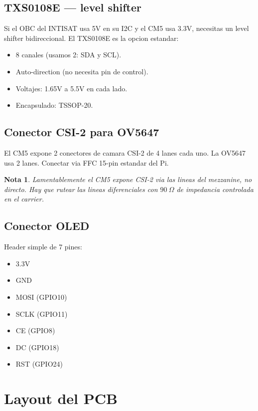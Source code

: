 \documentclass[11pt,a4paper,oneside,openright]{book}
\newtheorem*{nota}{Nota}
\begin{document}
\section{TXS0108E --- level shifter}

Si el OBC del INTISAT usa 5V en su I2C y el CM5 usa 3.3V, necesitas un
level shifter bidireccional. El TXS0108E es la opcion estandar:

\begin{itemize}[leftmargin=2em]
  \item 8 canales (usamos 2: SDA y SCL).
  \item Auto-direction (no necesita pin de control).
  \item Voltajes: 1.65V a 5.5V en cada lado.
  \item Encapsulado: TSSOP-20.
\end{itemize}

\section{Conector CSI-2 para OV5647}

El CM5 expone 2 conectores de camara CSI-2 de 4 lanes cada uno. La OV5647
usa 2 lanes. Conectar via FFC 15-pin estandar del Pi.

\begin{nota}
Lamentablemente el CM5 expone CSI-2 via las lineas del mezzanine, no
directo. Hay que rutear las lineas diferenciales con $90~\Omega$ de impedancia
controlada en el carrier.
\end{nota}

\section{Conector OLED}

Header simple de 7 pines:
\begin{itemize}[leftmargin=2em]
  \item 3.3V
  \item GND
  \item MOSI (GPIO10)
  \item SCLK (GPIO11)
  \item CE (GPIO8)
  \item DC (GPIO18)
  \item RST (GPIO24)
\end{itemize}

\chapter{Layout del PCB}
\end{document}
